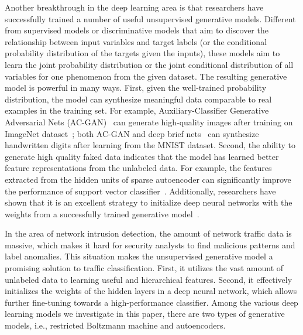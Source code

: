 Another breakthrough in the deep learning area is that researchers have successfully trained a number of useful unsupervised generative models.
Different from supervised models or discriminative models that aim to discover the relationship between
input variables and target labels (or the conditional probability distribution of the targets given the inputs),
these models aim to learn the joint probability distribution or the joint conditional distribution of all variables for one phenomenon from the given dataset.
The resulting generative model is powerful in many ways.
First, given the well-trained probability distribution, the model can synthesize meaningful data comparable to real examples in the training set.
For example, Auxiliary-Classifier Generative Adversarial Nets (AC-GAN)~\cite{AC-GAN} can generate high-quality images after training on ImageNet dataset~\cite{ImageNet};
both AC-GAN and deep brief nets~\cite{DeepBeliefNets} can synthesize handwritten digits after learning from the MNIST dataset.
Second, the ability to generate high quality faked data indicates that
the model has learned better feature representations from the unlabeled data.
For example, the features extracted from the hidden units of sparse autoencoder can significantly improve the performance of support vector classifier~\cite{SparseAE}.
Additionally, researchers have shown that it is an excellent strategy to initialize deep neural networks
with the weights from a successfully trained generative model~\cite{DeepBeliefNets, Momentum}.

In the area of network intrusion detection, the amount of network traffic data is massive,
which makes it hard for security analysts to find malicious patterns and label anomalies.
This situation makes the unsupervised generative model a promising solution
to traffic classification. %
First, it utilizes the vast amount of unlabeled data to learning useful and hierarchical features. Second, it effectively initializes the weights of the hidden layers in a deep neural network, which allows further fine-tuning towards a high-performance classifier.
Among the various deep learning models we investigate in this paper, there are two types of generative models, i.e., restricted Boltzmann machine and autoencoders.


